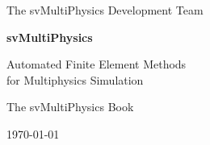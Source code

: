 \begin{titlepage}
\centering

\vspace*{2cm}

{\Large The svMultiPhysics Development Team}

\vspace{1.5cm}

{\Huge\bfseries svMultiPhysics}

\vspace{0.8cm}

{\LARGE Automated Finite Element Methods \\ for Multiphysics Simulation}

\vspace{1cm}

{\Large The svMultiPhysics Book}

\vfill

\begin{figure}[h]
\centering
\end{figure}

\vfill

{\large \today}

\end{titlepage}
